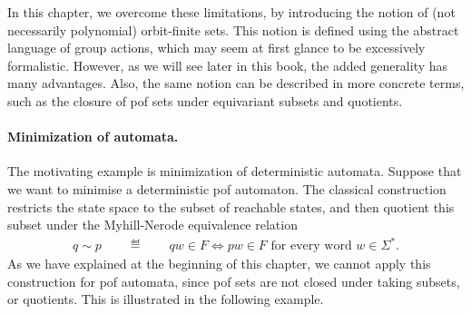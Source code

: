 In this chapter, we overcome these limitations, by introducing the notion of (not necessarily polynomial) orbit-finite sets. This notion is defined using the abstract language  of group actions, which may seem at first glance to be excessively formalistic. However, as we will see later in this book, the added generality has many advantages. Also, the same notion can be described in more concrete terms, such as the closure of pof sets under equivariant subsets and quotients.



\paragraph*{Minimization of automata.} The motivating example is  minimization of deterministic automata. Suppose that we want to minimise a deterministic pof automaton. The classical construction restricts the state space to  the subset of reachable states, and then quotient this subset under the Myhill-Nerode equivalence relation
\begin{align*}
q \sim p \qquad \eqdef \qquad qw \in F \Leftrightarrow pw \in F \text{ for every word $w \in \Sigma^*$}.
\end{align*}
As we have explained at the beginning of this chapter, we cannot apply this construction for pof automata,  since pof sets are not closed under taking subsets, or quotients. This is illustrated in the following example.

